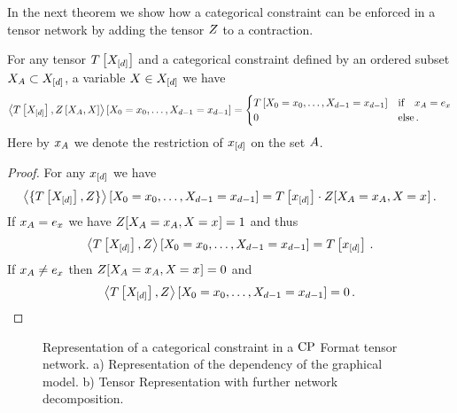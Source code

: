 In the next theorem we show how a categorical constraint can be enforced in a tensor network by adding the tensor $Z$ to a contraction.

\begin{theorem}
	For any tensor $T\left[X_{[d]}\right]$ and a categorical constraint defined by an ordered subset $X_{A}\subset X_{[d]}$, a variable $X\in X_{[d]}$ we have
	\begin{align*}
	 	\left\langle T\left[X_{[d]}\right],Z\left[X_{A},X\right]\right\rangle \left[ X_{0}=x_{0},\ldots,X_{d-1}=x_{d-1} \right]
		= \begin{cases}
			T\left[X_{0}=x_{0},\ldots,X_{d-1}=x_{d-1}\right] & \text{if} \quad x_{A} = e_{x} \\
			0 & \text{else} \, .
		\end{cases}
	\end{align*}
	Here by $x_{A}$ we denote the restriction of $x_{[d]}$ on the set $A$.
\end{theorem}
\begin{proof}
	For any $x_{[d]}$ we have
		\[ \left\langle \{T\left[X_{[d]}\right], Z\}\right\rangle \left[ X_{0}=x_{0},\ldots,X_{d-1}=x_{d-1} \right]  =
			T\left[x_{[d]}\right] \cdot Z[X_{A}=x_{A},X_{}=x_{}] \, .
		\]
	If $x_{A} = e_{x}$ we have $Z[X_{A}=x_{A},X_{}=x_{}] = 1$ and thus
		\[ \left\langle T\left[X_{[d]}\right],Z\right\rangle \left[ X_{0}=x_{0},\ldots,X_{d-1}=x_{d-1} \right]  =  T\left[x_{[d]}\right]  \, . \]
	If $x_{A} \neq e_{x}$ then $Z[X_{A}=x_{A},X_{}=x_{}] = 0$ and
		\[ \left\langle T\left[X_{[d]}\right],Z\right\rangle \left[ X_{0}=x_{0},\ldots,X_{d-1}=x_{d-1} \right]  = 0 \, . \]
\end{proof}

\begin{figure}[h]
\begin{center}
	
\end{center}
\caption{Representation of a categorical constraint in a $\mathrm{CP}$ Format tensor network.
	a) Representation of the dependency of the graphical model.
	b) Tensor Representation with further network decomposition.
	}
\label{fig:CategoricalDecomposition}
\end{figure}

